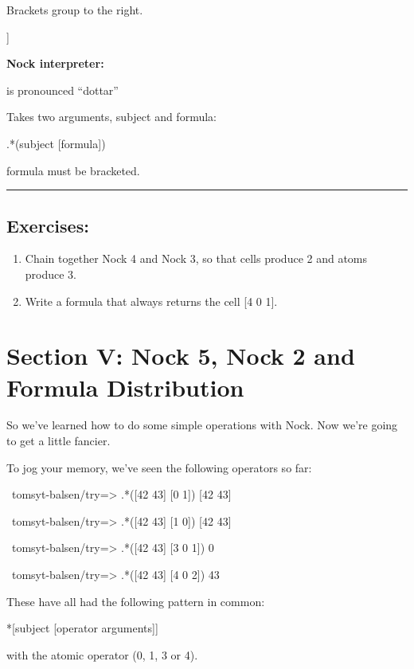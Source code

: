 Brackets group to the right.
\begin{code}
[a b c]         [a [b c]]
\end{code}

\textbf{Nock interpreter:}

 is pronounced ``dottar''

Takes two arguments, subject and formula:
\begin{code}
.*(subject [formula])
\end{code}
formula must be bracketed.

\begin{center}
\rule{3in}{0.4pt}
\end{center}

\subsection{Exercises:}

\begin{enumerate}
\item Chain together Nock 4 and Nock 3, so that cells produce 2 and atoms produce 3.
\item Write a formula that always returns the cell [4 0 1].
\end{enumerate}

\section{Section V: Nock 5, Nock 2 and Formula Distribution}

So we've learned how to do some simple operations with Nock. Now we're going to get a little fancier.

To jog your memory, we've seen the following operators so far:

\begin{code}
~tomsyt-balsen/try=> .*([42 43] [0 1])
[42 43]

~tomsyt-balsen/try=> .*([42 43] [1 0])
[42 43]

~tomsyt-balsen/try=> .*([42 43] [3 0 1])
0

~tomsyt-balsen/try=> .*([42 43] [4 0 2])
43
\end{code}
These have all had the following pattern in common:

\begin{code}
*[subject [operator arguments]]
\end{code}
with the atomic operator (0, 1, 3 or 4).

